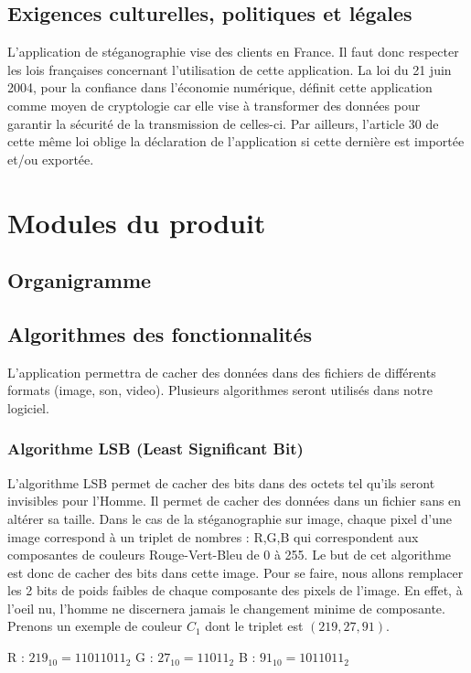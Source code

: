 \documentclass[11pt]{article}
\begin{document}
\subsection{Exigences culturelles, politiques et légales}
L'application de stéganographie vise des clients en France. Il faut donc respecter les lois françaises concernant l'utilisation de cette application. 
La loi du 21 juin 2004, pour la confiance dans l'économie numérique, définit cette application comme moyen de cryptologie car elle vise à transformer des données pour garantir la sécurité de la transmission de celles-ci. 
Par ailleurs, l'article 30 de cette même loi oblige la déclaration de l'application si cette dernière est importée et/ou exportée. 

\section{Modules du produit}

\subsection{Organigramme}

\subsection{Algorithmes des fonctionnalités}
L'application permettra de cacher des données dans des fichiers de différents formats (image, son, video). 
Plusieurs algorithmes seront utilisés dans notre logiciel.

\subsubsection{Algorithme LSB (Least Significant Bit)}
L'algorithme LSB permet de cacher des bits dans des octets tel qu'ils seront invisibles pour l'Homme. 
Il permet de cacher des données dans un fichier sans en altérer sa taille. 
Dans le cas de la stéganographie sur image, chaque pixel d'une image correspond à un triplet de nombres : R,G,B qui correspondent aux composantes de couleurs Rouge-Vert-Bleu de 0 à 255. 
Le but de cet algorithme est donc de cacher des bits dans cette image. Pour se faire, nous allons remplacer les 2 bits de poids faibles de chaque composante des pixels de l'image. 
En effet, à l'oeil nu, l'homme ne discernera jamais le changement minime de composante. 
Prenons un exemple de couleur $C_1$ dont le triplet est $(219,27,91)$. 

R : $219_{10} = 11011011_2$	\qquad G : $27_{10} = 11011_2$ \qquad B : $91_{10} = 1011011_2$
\end{document}
